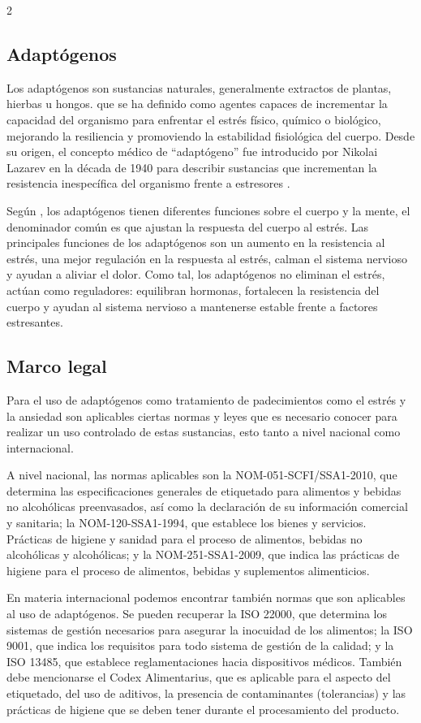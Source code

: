 \begin{multicols}{2}
\subsection{Adaptógenos}

Los adaptógenos son sustancias naturales, generalmente extractos de plantas, hierbas u hongos. que se ha definido como agentes capaces de incrementar la capacidad del organismo para enfrentar el estrés físico, químico o biológico, mejorando la resiliencia y promoviendo la estabilidad fisiológica del cuerpo. Desde su origen, el concepto médico de “adaptógeno” fue introducido por Nikolai Lazarev en la década de 1940 para describir sustancias que incrementan la resistencia inespecífica del organismo frente a estresores \citep{liao2018}.

Según \citet{colino2025}, los adaptógenos tienen diferentes funciones sobre el cuerpo y la mente, el denominador común es que ajustan la respuesta del cuerpo al estrés. Las principales funciones de los adaptógenos son un aumento en la resistencia al estrés, una mejor regulación en la respuesta al estrés, calman el sistema nervioso y ayudan a aliviar el dolor. Como tal, los adaptógenos no eliminan el estrés, actúan como reguladores: equilibran hormonas, fortalecen la resistencia del cuerpo y ayudan al sistema nervioso a mantenerse estable frente a factores estresantes.

\subsection{Marco legal}

Para el uso de adaptógenos como tratamiento de padecimientos como el estrés y la ansiedad son aplicables ciertas normas y leyes que es necesario conocer para realizar un uso controlado de estas sustancias, esto tanto a nivel nacional como internacional.

A nivel nacional, las normas aplicables son la NOM-051-SCFI/SSA1-2010, que determina las especificaciones generales de etiquetado para alimentos y bebidas no alcohólicas preenvasados, así como la declaración de su información comercial y sanitaria; la NOM-120-SSA1-1994, que establece los bienes y servicios. Prácticas de higiene y sanidad para el proceso de alimentos, bebidas no alcohólicas y alcohólicas; y la NOM-251-SSA1-2009, que indica las prácticas de higiene para el proceso de alimentos, bebidas y suplementos alimenticios.

En materia internacional podemos encontrar también normas que son aplicables al uso de adaptógenos. Se pueden recuperar la ISO 22000, que determina los sistemas de gestión necesarios para asegurar la inocuidad de los alimentos; la ISO 9001, que indica los requisitos para todo sistema de gestión de la calidad; y la ISO 13485, que establece reglamentaciones hacia dispositivos médicos. También debe mencionarse el Codex Alimentarius, que es aplicable para el aspecto del etiquetado, del uso de aditivos, la presencia de contaminantes (tolerancias) y las prácticas de higiene que se deben tener durante el procesamiento del producto.


\end{multicols}
